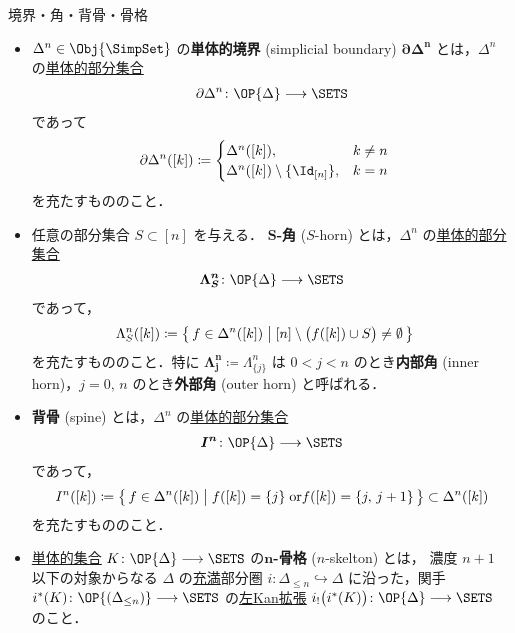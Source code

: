 \documentclass[TQFT_main]{subfiles}
\begin{document}
\begin{mydef}[label=def:horn,breakable]{境界・角・背骨・骨格}
    \begin{itemize}
        \item $\Delta^n \in \Obj{\SimpSet}$ の\textbf{単体的境界} (simplicial boundary) $\bm{\partial \Delta^n}$ とは，$\Delta^n$ の\hyperref[def:SimpSet]{単体的部分集合}
        \begin{align}
            \partial \Delta^n \colon \OP{\Delta} \lto \SETS
        \end{align}
        であって 
        \begin{align}
            \partial \Delta^n ([k]) &\coloneqq 
            \begin{cases}
                \Delta^n ([k]), &k \neq n \\
                \Delta^n ([k]) \setminus \{\Id_{[n]}\}, &k=n
            \end{cases}
        \end{align}
        を充たすもののこと．
        
        \item 任意の部分集合 $S \subset [n]$ を与える．
        \textbf{$\bm{S}$-角} ($S$-horn) とは，$\Delta^n$ の\hyperref[def:SimpSet]{単体的部分集合}
        \begin{align}
            \bm{\Lambda^n_S} \colon \OP{\Delta} \lto \SETS
        \end{align}
        であって，
        \begin{align}
            \Lambda^n_S ([k]) &\coloneqq \bigl\{\, f \in \Delta^n([k]) \bigm| [n] \setminus \bigl(f([k]) \cup S \bigr) \neq \emptyset  \,\bigr\}
        \end{align}
        を充たすもののこと．特に $\bm{\Lambda^n_j} \coloneqq \Lambda^n_{\{j\}}$ は $0 < j < n$ のとき\textbf{内部角} (inner horn)，$j = 0,\, n$ のとき\textbf{外部角} (outer horn) と呼ばれる．

        \item \textbf{背骨} (spine) とは，$\Delta^n$ の\hyperref[def:SimpSet]{単体的部分集合}
        \begin{align}
            \bm{I^n} \colon \OP{\Delta} \lto \SETS
        \end{align}
        であって，
        \begin{align}
            I^n ([k]) \coloneqq \bigl\{\, f \in \Delta^n([k]) \bigm| f([k]) = \{j\}\; \mathrm{or} f([k]) = \{j,\, j+1\} \,\bigr\} \subset \Delta^n([k])
        \end{align}
        を充たすもののこと．
        \item \hyperref[def:SimpSet]{単体的集合} $K \colon \OP{\Delta} \lto \SETS$ の\textbf{$\bm{n}$-骨格} ($n$-skelton) とは，
        濃度 $n+1$ 以下の対象からなる $\Delta$ の\hyperref[def:faithful]{充満}部分圏 $i \colon \Delta_{\le n} \hookrightarrow \Delta$ に沿った，関手 $i^*(K) \colon \OP{(\Delta_{\le n})} \lto \SETS$ の\hyperref[def:Kanext]{左Kan拡張} $i_! \bigl(i^* (K)\bigr) \colon \OP{\Delta} \lto \SETS$ のこと．


\end{itemize}
\end{mydef}
\end{document}
